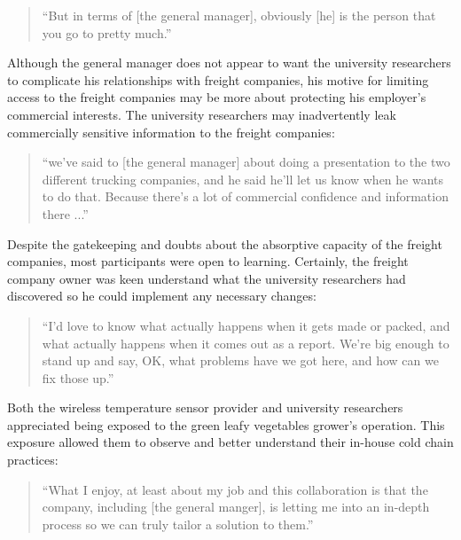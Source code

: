 \begin{quote}
\small
\enquote{But in terms of [the general manager], obviously [he] is the person that you go to pretty much.} \\
\end{quote}

Although the general manager does not appear to want the university researchers to complicate his relationships with freight companies, his motive for limiting access to the freight companies may be more about protecting his employer's commercial interests. The university researchers may inadvertently leak commercially sensitive information to the freight companies:

\begin{quote}
\small
\enquote{we've said to [the general manager] about doing a presentation to the two different trucking companies, and he said he'll let us know when he wants to do that. Because there’s a lot of commercial confidence and information there ...} \\
\end{quote}

Despite the gatekeeping and doubts about the absorptive capacity of the freight companies, most participants were open to learning. Certainly, the freight company owner was keen understand what the university researchers had discovered so he could implement any necessary changes:

\begin{quote}
\small
\enquote{I'd love to know what actually happens when it gets made or packed, and what actually happens when it comes out as a report. We're big enough to stand up and say, OK, what problems have we got here, and how can we fix those up.} \\
\end{quote}

Both the wireless temperature sensor provider and university researchers appreciated being exposed to the green leafy vegetables grower's operation. This exposure allowed them to observe and better understand their in-house cold chain practices:

\begin{quote}
\small
\enquote{What I enjoy, at least about my job and this collaboration is that the company, including [the general manger], is letting me into an in-depth process so we can truly tailor a solution to them.} \\
\end{quote}

